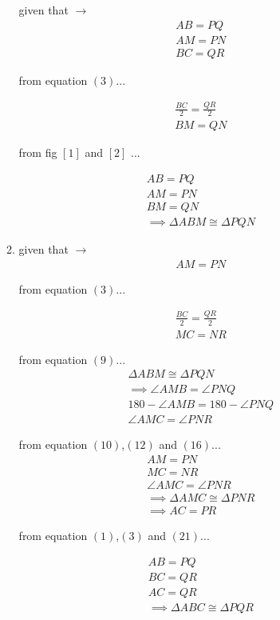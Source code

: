 \documentclass[12pt,a4paper]{exam}
\begin{document}
\begin{enumerate}
\begin{enumerate}
		given that $\to$\\
		\begin{align}
			AB = PQ\\
			AM = PN\\
			BC = QR	
		\end{align}
	
		from equation $\left(3\right)$...
	
		\begin{align}
			\frac{BC}{2} = \frac{QR}{2} \\
			BM = QN
		\end{align}

		from fig $\left[1\right]$ and $\left[2\right]$ ...

		\begin{align}
	 		AB = PQ\\
	 		AM = PN\\
	 		BM = QN\\
			\implies  \Delta ABM \cong \Delta PQN
		\end{align}
	
		\item
		given that $\to$\\
		\begin{align}
			AM = PN
		\end{align}
	
		from equation $\left(3\right)$...
	
		\begin{align}
			\frac{BC}{2} = \frac{QR}{2} \\
			MC = NR
		\end{align}
	
	
		from equation $\left(9\right)$...
		\begin{align}
			\Delta ABM \cong \Delta PQN 
			\\
			\implies \angle AMB = \angle PNQ
			\\
			180 - \angle AMB = 180 -  \angle PNQ
			\\
			\angle AMC = \angle PNR
		\end{align}
	
		from equation $\left(10\right)$,$\left(12\right)$ and $\left(16\right)$...
		\begin{align}
			AM = PN
			\\
			MC = NR
			\\
			\angle AMC = \angle PNR
			\\
			\implies  \Delta AMC \cong \Delta PNR
			\\
			\implies AC = PR
		\end{align}
	
		from equation $\left(1\right)$,$\left(3\right)$ and $\left(21\right)$...
		
		\begin{align}
			AB = PQ\\
			BC = QR\\
			AC = QR\\
			\implies  \Delta ABC \cong \Delta PQR
		\end{align}
	
	\end{enumerate}
	
\end{enumerate}
\end{document}

